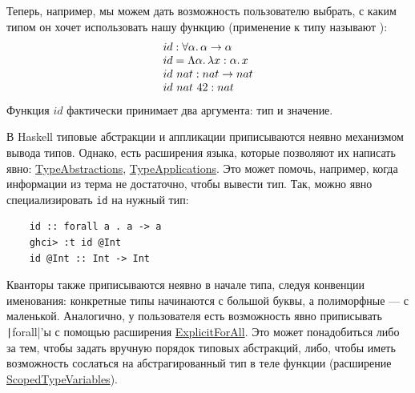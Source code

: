 Теперь, например, мы можем дать возможность пользователю выбрать, с каким типом он хочет использовать нашу функцию (применение к типу называют ):
\[
    \begin{array}{ll}
        id : \forall\alpha\ldotp\alpha\to\alpha            \\
        id = \Lambda\alpha\ldotp\lambda x : \alpha\ldotp x \\
        id ~ nat : nat \to nat                           \\
        id~ nat ~ 42 : nat
    \end{array}
\]
Функция $id$ фактически принимает два аргумента: тип и значение.

В Haskell типовые абстракции и аппликации приписываются неявно механизмом вывода типов.
Однако, есть расширения языка, которые позволяют их написать явно: \href{https://downloads.haskell.org/ghc/latest/docs/users_guide/exts/type_abstractions.html}{TypeAbstractions}, \href{https://downloads.haskell.org/ghc/latest/docs/users_guide/exts/type_applications.html}{TypeApplications}.
Это может помочь, например, когда информации из терма не достаточно, чтобы вывести тип.
Так, можно явно специализировать \texttt{id} на нужный тип:
\begin{verbatim}
    id :: forall a . a -> a
    ghci> :t id @Int
    id @Int :: Int -> Int
\end{verbatim}

Кванторы также приписываются неявно в начале типа, следуя конвенции именования: конкретные типы начинаются с большой буквы, а полиморфные --- с маленькой.
Аналогично, у пользователя есть возможность явно приписывать \texttt|forall|'ы с помощью расширения \href{https://downloads.haskell.org/ghc/latest/docs/users_guide/exts/explicit_forall.html\#extension-ExplicitForAll}{ExplicitForAll}.
Это может понадобиться либо за тем, чтобы задать вручную порядок типовых абстракций, либо, чтобы иметь возможность сослаться на абстрагированный тип в теле функции (расширение \href{https://downloads.haskell.org/ghc/latest/docs/users_guide/exts/scoped_type_variables.html#extension-ScopedTypeVariables}{ScopedTypeVariables}).

